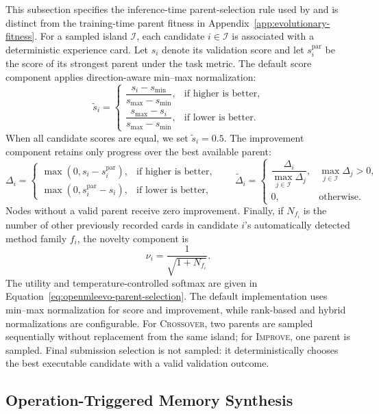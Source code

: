 This subsection specifies the inference-time parent-selection rule used by \openmleevo{} and is distinct from the training-time parent fitness in Appendix~\ref{app:evolutionary-fitness}. For a sampled island $\mathcal{I}$, each candidate $i\in\mathcal{I}$ is associated with a deterministic experience card. Let $s_i$ denote its validation score and let $s_i^{\mathrm{par}}$ be the score of its strongest parent under the task metric. The default score component applies direction-aware min--max normalization:
\[
\tilde{s}_i =
\begin{cases}
\dfrac{s_i-s_{\min}}{s_{\max}-s_{\min}}, & \text{if higher is better},\\[6pt]
\dfrac{s_{\max}-s_i}{s_{\max}-s_{\min}}, & \text{if lower is better}.
\end{cases}
\]
When all candidate scores are equal, we set $\tilde{s}_i=0.5$. The improvement component retains only progress over the best available parent:
\[
\Delta_i =
\begin{cases}
\max(0,s_i-s_i^{\mathrm{par}}), & \text{if higher is better},\\
\max(0,s_i^{\mathrm{par}}-s_i), & \text{if lower is better},
\end{cases}
\qquad
\widetilde{\Delta}_i =
\begin{cases}
\dfrac{\Delta_i}{\max_{j\in\mathcal{I}}\Delta_j}, & \max_{j\in\mathcal{I}}\Delta_j>0,\\[6pt]
0, & \text{otherwise}.
\end{cases}
\]
Nodes without a valid parent receive zero improvement. Finally, if $N_{f_i}$ is the number of other previously recorded cards in candidate $i$'s automatically detected method family $f_i$, the novelty component is
\[
\nu_i = \frac{1}{\sqrt{1+N_{f_i}}}.
\]
The utility and temperature-controlled softmax are given in Equation~\ref{eq:openmleevo-parent-selection}. The default implementation uses min--max normalization for score and improvement, while rank-based and hybrid normalizations are configurable. For \textsc{Crossover}, two parents are sampled sequentially without replacement from the same island; for \textsc{Improve}, one parent is sampled. Final submission selection is not sampled: it deterministically chooses the best executable candidate with a valid validation outcome.

\thispagestyle{fancy}

\subsection{Operation-Triggered Memory Synthesis}
\label{app:openmleevo-memory-synthesis}

